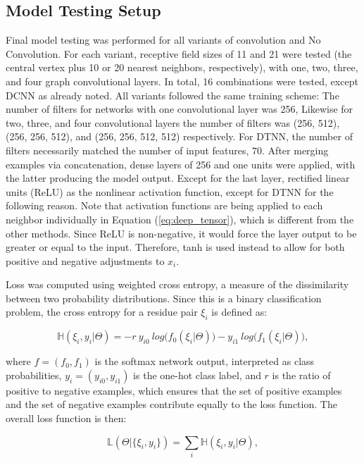 \subsection{Model Testing Setup}

Final model testing was performed for all variants of convolution and No Convolution.
For each variant, receptive field sizes of 11 and 21 were tested (the central vertex plus 10 or 20 nearest neighbors, respectively), with one, two, three, and four graph convolutional layers. 
In total, 16 combinations were tested, except DCNN as already noted.
All variants followed the same training scheme:
The number of filters for networks with one convolutional layer was 256, Likewise for two, three, and four convolutional layers the number of filters was (256, 512), (256, 256, 512), and (256, 256, 512, 512) respectively.
For DTNN, the number of filters necessarily matched the number of input features, 70.
After merging examples via concatenation, dense layers of 256 and one units were applied, with the latter producing the model output.
Except for the last layer, rectified linear units (ReLU) as the nonlinear activation function, except for DTNN for the following reason.
Note that activation functions are being applied to each neighbor individually in Equation (\ref{eq:deep_tensor}), which is different from the other methods.
Since ReLU is non-negative, it would force the layer output to be greater or equal to the input.
Therefore, tanh is used instead to allow for both positive and negative adjustments to $x_i$.

Loss was computed using weighted cross entropy, a measure of the dissimilarity between two probability distributions.
Since this is a binary classification problem, the cross entropy for a residue pair $\xi_i$ is defined as: 

\begin{equation}
\mathbb{H}(\xi_i, y_i | \Theta) = - r ~ y_{i0} ~ log\big(f_0(\xi_i|\Theta)\big) - y_{i1} ~ log\big(f_1(\xi_i|\Theta)\big),
\label{eq:weighted_ce}
\end{equation}

\noindent
where $f = (f_0, f_1)$ is the softmax network output, interpreted as class probabilities, $y_i = (y_{i0}, y_{i1})$ is the one-hot class label, and $r$ is the ratio of positive to negative examples, which ensures that the set of positive examples and the set of negative examples contribute equally to the loss function.
The overall loss function is then:

\begin{equation}
\mathbb{L}(\Theta | \{\xi_i, y_i\}) = \sum_{i} \mathbb{H}(\xi_i, y_i | \Theta),
\end{equation}

